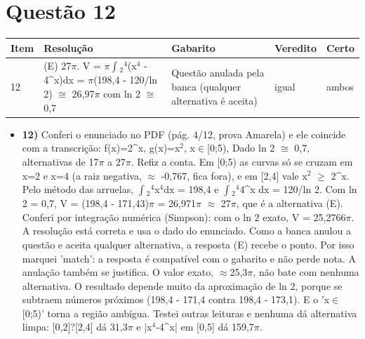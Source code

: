 \documentclass{article}%
\begin{document}
\section*{Questão 12}%
\begin{longtable}{@{}p{} p{} p{} p{} p{}@{}}\toprule Item & Resolução & Gabarito & Veredito & Certo \\ \midrule
12 & (E) 27$\pi$. V = $\pi$$\int$$_{2}$$^{4}$(x$^{4}$ - 4\^{}x)dx = $\pi$(198,4 - 120/ln 2) $\cong$ 26,97$\pi$ com ln 2 $\cong$ 0,7 & Questão anulada pela banca (qualquer alternativa é aceita) & igual & ambos \\
\bottomrule\end{longtable}%
\begin{itemize}%
\item%
\textbf{12)} Conferi o enunciado no PDF (pág. 4/12, prova Amarela) e ele coincide com a transcrição: f(x)=2\^{}x, g(x)=x$^2$, x$\in${[}0;5), Dado ln 2 $\cong$ 0,7, alternativas de 17$\pi$ a 27$\pi$. Refiz a conta. Em {[}0;5) as curvas só se cruzam em x=2 e x=4 (a raiz negativa, $\approx$ -0,767, fica fora), e em {[}2,4{]} vale x$^2$ $\geq$ 2\^{}x. Pelo método das arruelas, $\int$$_{2}$$^{4}$x$^{4}$dx = 198,4 e $\int$$_{2}$$^{4}$4\^{}x dx = 120/ln 2. Com ln 2 = 0,7, V = (198,4 - 171,43)$\pi$ = 26,971$\pi$ $\approx$ 27$\pi$, que é a alternativa (E). Conferi por integração numérica (Simpson): com o ln 2 exato, V = 25,2766$\pi$. A resolução está correta e usa o dado do enunciado. Como a banca anulou a questão e aceita qualquer alternativa, a resposta (E) recebe o ponto. Por isso marquei 'match': a resposta é compatível com o gabarito e não perde nota. A anulação também se justifica. O valor exato, $\approx$25,3$\pi$, não bate com nenhuma alternativa. O resultado depende muito da aproximação de ln 2, porque se subtraem números próximos (198,4 - 171,4 contra 198,4 - 173,1). E o 'x$\in${[}0;5)' torna a região ambígua. Testei outras leituras e nenhuma dá alternativa limpa: {[}0,2{]}?{[}2,4{]} dá 31,3$\pi$ e |x$^{4}$-4\^{}x| em {[}0,5{]} dá 159,7$\pi$.%
\end{itemize}%
\end{document}
